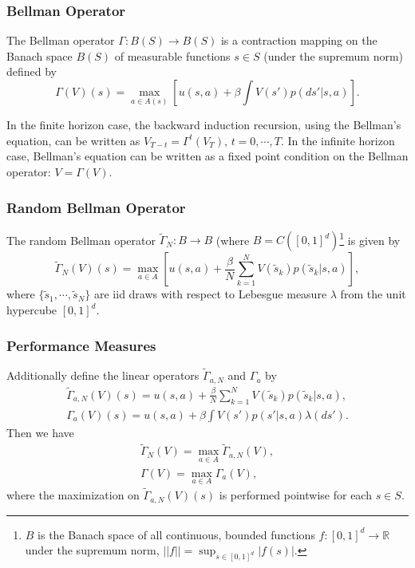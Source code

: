 \documentclass{beamer}
\begin{document}
\begin{frame}[fragile]
\frametitle{Bellman Operator}

\begin{definition}
The Bellman operator $\Gamma: B(S)\to B(S)$ is a contraction mapping on the Banach space $B(S)$ of measurable functions $s\in S$ (under the supremum norm) defined by
\[
\Gamma(V)(s)=\max_{a\in A(s)}\left[u(s, a)+\beta\int V(s')p(ds'|s, a)\right].
\]
\end{definition}
In the finite horizon case, the backward induction recursion, using the Bellman's equation, can be written as $V_{T-t}=\Gamma^t(V_T)$, $t=0, \cdots, T$. In the infinite horizon case, Bellman's equation can be written as a fixed point condition on the Bellman operator: $V=\Gamma(V)$.
\end{frame}

\begin{frame}[fragile]
\frametitle{Random Bellman Operator}

\begin{definition}
The random Bellman operator $\widetilde{\Gamma}_N: B\to B$ (where $B=C([0, 1]^d)$\footnote[frame]{$B$ is the Banach space of all continuous, bounded functions $f: [0, 1]^d\to\mathbb{R}$ under the supremum norm, $||f||=\sup_{s\in[0, 1]^d}|f(s)|$.} is given by
\[
\widetilde{\Gamma}_N(V)(s)=\max_{a\in A}\left[u(s, a)+\frac{\beta}{N}\sum_{k=1}^NV(\widetilde{s}_k)p(\widetilde{s}_k|s, a)\right],
\]
where $\{\widetilde{s}_1, \cdots, \widetilde{s}_N\}$ are iid draws with respect to Lebesgue measure $\lambda$ from the unit hypercube $[0, 1]^d$.
\end{definition}
\end{frame}

\begin{frame}[fragile]
\frametitle{Performance Measures}

Additionally define the linear operators $\widetilde{\Gamma}_{a, N}$ and $\Gamma_a$ by
\begin{gather*}
\widetilde{\Gamma}_{a, N}(V)(s)=u(s, a)+\frac{\beta}{N}\sum_{k=1}^NV(\widetilde{s}_k)p(\widetilde{s}_k|s, a),\\
\Gamma_a(V)(s)=u(s, a)+\beta\int V(s')p(s'|s, a)\lambda(ds').
\end{gather*}
Then we have
\begin{gather*}
\widetilde{\Gamma}_N(V)=\max_{a\in A}\widetilde{\Gamma}_{a, N}(V),\\
\Gamma(V)=\max_{a\in A}\Gamma_a(V),
\end{gather*}
where the maximization on $\widetilde{\Gamma}_{a, N}(V)(s)$ is performed pointwise for each $s\in S$.
\end{frame}
\end{document}
